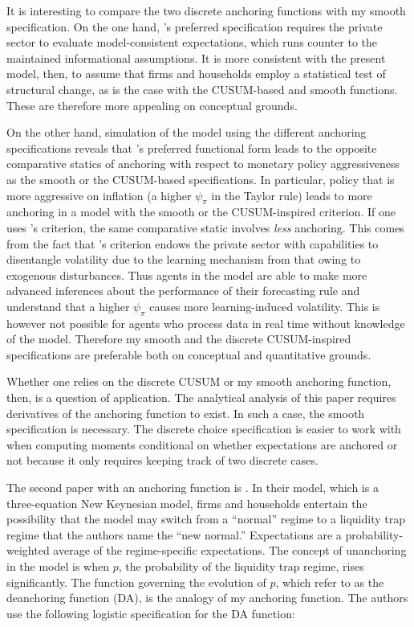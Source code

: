 \documentclass[11pt]{article}
\renewcommand{\[}{\begin{equation}}
\renewcommand{\]}{\end{equation}}
\begin{document}
It is interesting to compare the two discrete anchoring functions with my smooth specification. On the one hand, \cite{carvalho2019anchored}'s preferred specification requires the private sector to evaluate model-consistent expectations, which runs counter to the maintained informational assumptions. It is more consistent with the present model, then, to assume that firms and households employ a statistical test of structural change, as is the case with the CUSUM-based and smooth functions. These are therefore more appealing on conceptual grounds.

On the other hand, simulation of the model using the different anchoring specifications reveals that \cite{carvalho2019anchored}'s preferred functional form leads to the opposite comparative statics of anchoring with respect to monetary policy aggressiveness as the smooth or the CUSUM-based specifications. In particular,  policy that is more aggressive on inflation (a higher $\psi_{\pi}$ in the Taylor rule) leads to more anchoring in a model with the smooth or the CUSUM-inspired criterion. If one uses \cite{carvalho2019anchored}'s criterion, the same comparative static involves \emph{less} anchoring. This comes from the fact that \cite{carvalho2019anchored}'s criterion endows the private sector with capabilities to disentangle volatility due to the learning mechanism from that owing to exogenous disturbances. Thus agents in the \cite{carvalho2019anchored} model are able to make more advanced inferences about the performance of their forecasting rule and understand that a higher $\psi_{\pi}$ causes more learning-induced volatility. This is however not possible for agents who process data in real time without knowledge of the model. Therefore my smooth and the discrete CUSUM-inspired specifications are preferable both on conceptual and quantitative grounds.

Whether one relies on the discrete CUSUM or my smooth anchoring function, then, is a question of application. The analytical analysis of this paper requires derivatives of the anchoring function to exist. In such a case, the smooth specification is necessary. The discrete choice specification is easier to work with when computing moments conditional on whether expectations are anchored or not because it only requires keeping track of two discrete cases.

The second paper with an anchoring function is \cite{gobbi2019monetary}. In their model, which is a three-equation New Keynesian model, firms and households entertain the possibility that the model may switch from a ``normal'' regime to a liquidity trap regime that the authors name the ``new normal.'' Expectations are a probability-weighted average of the regime-specific expectations. The concept of unanchoring in the model is when $p$, the probability of the liquidity trap regime, rises significantly. The function governing the evolution of $p$, which \cite{gobbi2019monetary} refer to as the deanchoring function (DA), is the analogy of my anchoring function. The authors use the following logistic specification for the DA function:
\end{document}
